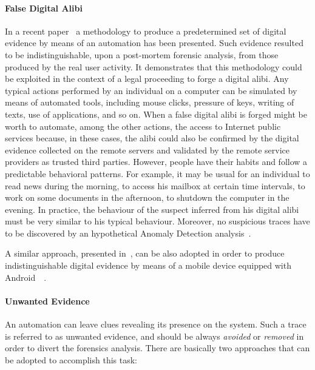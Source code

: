 \documentclass[10pt, conference]{IEEEtran}
\begin{document}
\paragraph{False Digital Alibi}
In a recent paper~\cite{autoalibi} a methodology to produce a predetermined set of digital evidence by means of an automation has
been presented. Such evidence resulted to be indistinguishable, upon a post-mortem forensic analysis, from those produced by the
real user activity. It demonstrates that this methodology could be exploited in the context of a legal proceeding to forge a digital alibi.
Any typical actions performed by an individual on a computer can be simulated by means of automated tools, including mouse clicks,
pressure of keys, writing of texts, use of applications, and so on. When a false digital alibi is forged might be worth to automate, among
the other actions, the access to Internet public services because, in these cases, the alibi could also be confirmed by the digital evidence
collected on the remote servers and  validated by the remote service providers as trusted third parties.
However, people have their habits and follow a predictable behavioral patterns. For example, it may be usual for an individual to read
news during the morning, to access his mailbox at certain time intervals, to work on some documents in the afternoon, to shutdown the
computer in the evening. In practice, the behaviour of the suspect inferred from his digital alibi must be very similar to his typical behaviour.
Moreover, no suspicious traces have to be discovered by an hypothetical Anomaly Detection analysis~\cite{PalmieriF10}.

A similar approach, presented in~\cite{autoalibi}, can be also adopted in order to produce indistinguishable digital evidence by means of
a mobile device equipped with Android~\cite{androalibi}~\cite{android_af}.


\paragraph{Unwanted Evidence}
An automation can leave clues revealing its presence on the system. Such a trace is referred to as unwanted evidence, and should
be always \textit{avoided} or \textit{removed} in order to divert the forensics analysis. There are basically two approaches that can
be adopted to accomplish this task:
\end{document}
